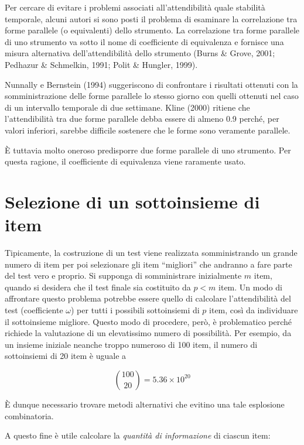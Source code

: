 \documentclass[
  11pt,
]{krantz}
\theoremstyle{definition}
\theoremstyle{definition}
\theoremstyle{definition}
\theoremstyle{definition}
\theoremstyle{remark}
\begin{document}
Per cercare di evitare i problemi associati all'attendibilità quale stabilità temporale, alcuni autori si sono posti il problema di esaminare la correlazione tra forme parallele (o equivalenti) dello strumento. La correlazione tra forme parallele di uno strumento va sotto il nome di coefficiente di equivalenza e fornisce una misura alternativa dell'attendibilità dello strumento (Burns \& Grove, 2001; Pedhazur \& Schmelkin, 1991; Polit \& Hungler, 1999).

Nunnally e Bernstein (1994) suggeriscono di confrontare i risultati ottenuti con la somministrazione delle forme parallele lo stesso giorno con quelli ottenuti nel caso di un intervallo temporale di due settimane. Kline (2000) ritiene che l'attendibilità tra due forme parallele debba essere di almeno 0.9 perché, per valori inferiori, sarebbe difficile sostenere che le forme sono veramente parallele.

È tuttavia molto oneroso predisporre due forme parallele di uno strumento. Per questa ragione, il coefficiente di equivalenza viene raramente usato.

\hypertarget{selezione-di-un-sottoinsieme-di-item}{%
\section{Selezione di un sottoinsieme di item}\label{selezione-di-un-sottoinsieme-di-item}}

Tipicamente, la costruzione di un test viene realizzata somministrando un grande numero di item per poi selezionare gli item ``migliori'' che andranno a fare parte del test vero e proprio. Si supponga di somministrare inizialmente \(m\) item, quando si desidera che il test finale sia costituito da \(p < m\) item. Un modo di affrontare questo problema potrebbe essere quello di calcolare l'attendibilità del test (coefficiente \(\omega\)) per tutti i possibili sottoinsiemi di \(p\) item, così da individuare il sottoinsieme migliore. Questo modo di procedere, però, è problematico perché richiede la valutazione di un elevatissimo numero di possibilità. Per esempio, da un insieme iniziale neanche troppo numeroso di 100 item, il numero di sottoinsiemi di 20 item è uguale a

\[\binom{100}{20} = 5.36 \times 10^{20}\]

È dunque necessario trovare metodi alternativi che evitino una tale esplosione combinatoria.

A questo fine è utile calcolare la \emph{quantità di informazione} di ciascun item:
\end{document}
